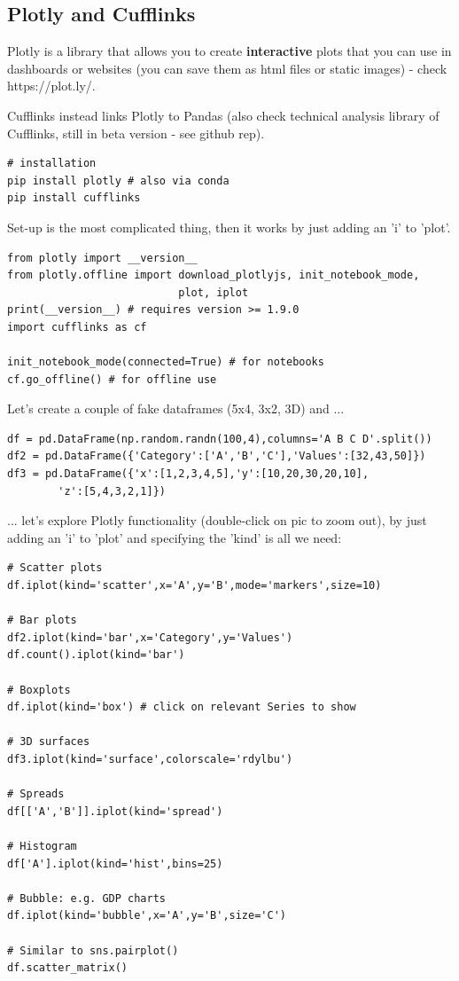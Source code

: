 \documentclass[12pt]{article}
\begin{document}
\subsection{Plotly and Cufflinks}
Plotly is a library that allows you to create \textbf{interactive} plots that you can use in dashboards or websites (you can save them as html files or static images) - check https://plot.ly/. 

Cufflinks instead links Plotly to Pandas (also check technical analysis library of Cufflinks, still in beta version - see github rep).

\begin{lstlisting}
# installation
pip install plotly # also via conda
pip install cufflinks
\end{lstlisting}

Set-up is the most complicated thing, then it works by just adding an 'i' to 'plot'.
\begin{lstlisting}
from plotly import __version__
from plotly.offline import download_plotlyjs, init_notebook_mode, 
                           plot, iplot
print(__version__) # requires version >= 1.9.0
import cufflinks as cf

init_notebook_mode(connected=True) # for notebooks
cf.go_offline() # for offline use
\end{lstlisting}

Let's create a couple of fake dataframes (5x4, 3x2, 3D) and ...
\begin{lstlisting}
df = pd.DataFrame(np.random.randn(100,4),columns='A B C D'.split())
df2 = pd.DataFrame({'Category':['A','B','C'],'Values':[32,43,50]})
df3 = pd.DataFrame({'x':[1,2,3,4,5],'y':[10,20,30,20,10],
		'z':[5,4,3,2,1]})
\end{lstlisting}
... let's explore Plotly functionality (double-click on pic to zoom out), by just adding an 'i' to 'plot' and specifying the 'kind' is all we need:
\begin{lstlisting}
# Scatter plots
df.iplot(kind='scatter',x='A',y='B',mode='markers',size=10) 

# Bar plots
df2.iplot(kind='bar',x='Category',y='Values')
df.count().iplot(kind='bar')

# Boxplots
df.iplot(kind='box') # click on relevant Series to show

# 3D surfaces
df3.iplot(kind='surface',colorscale='rdylbu')

# Spreads
df[['A','B']].iplot(kind='spread')

# Histogram
df['A'].iplot(kind='hist',bins=25)

# Bubble: e.g. GDP charts
df.iplot(kind='bubble',x='A',y='B',size='C')

# Similar to sns.pairplot()
df.scatter_matrix()
\end{lstlisting}
\end{document}
